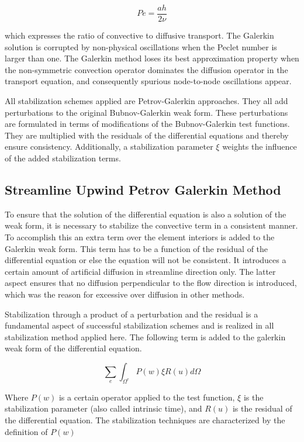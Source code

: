 $$Pe=\frac{ah}{2\nu}$$

\noindent which expresses the ratio of convective to diffusive transport.
The  Galerkin solution is corrupted by non-physical oscillations when the Peclet number is larger than one. The Galerkin method loses its best approximation property when the non-symmetric convection operator dominates the diffusion operator in the transport equation, and consequently spurious node-to-node oscillations appear.

\noindent All stabilization schemes applied are Petrov-Galerkin approaches. They all add perturbations to the original Bubnov-Galerkin weak form. These perturbations are formulated in terms of modifications of the Bubnov-Galerkin test functions. They are multiplied with the residuals of the differential equations and thereby ensure consistency. Additionally, a stabilization parameter $\xi$ weights the influence of the added stabilization terms.

\subsection{Streamline Upwind Petrov Galerkin Method}
To ensure that the solution of the differential equation is also a solution of the
weak form, it is necessary to stabilize the convective term in a consistent manner. To accomplish this an extra term over the element interiors is added
to the Galerkin weak form. This term has to be a function of the residual of the differential equation or else the equation will not be consistent. It introduces a certain amount of artificial diffusion in streamline direction only. The latter aspect ensures that no diffusion perpendicular to the flow direction is introduced, which was the reason for excessive over diffusion in other methods. 

\bigskip
\noindent Stabilization through a product of a perturbation and the residual
is a fundamental aspect of successful stabilization schemes and is realized in all stabilization method
applied here. The following term is added to the galerkin weak form of the differential equation. 

 $$\sum_e \int_{\Omega^e} P(w) \xi R(u)  d\Omega$$ 


\bigskip
\noindent Where $P(w)$ is a certain operator applied to the test function, $\xi$ is the stabilization
parameter (also called intrinsic time), and $R(u)$ is the residual of the differential
equation. The stabilization techniques are characterized by the definition of $P(w)$

